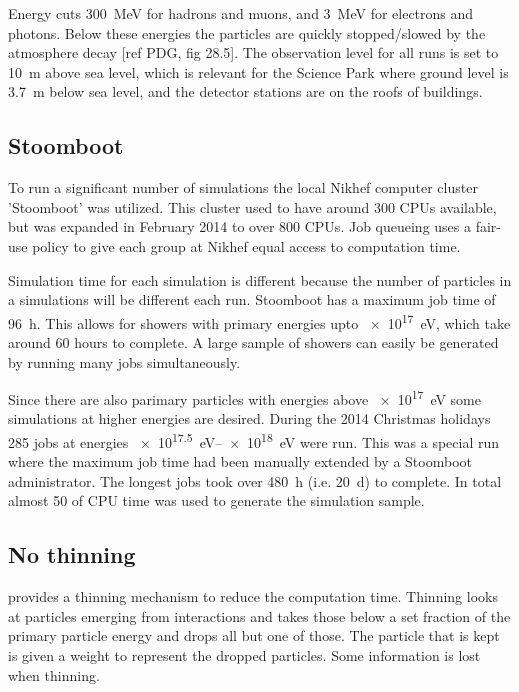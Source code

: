 Energy cuts \SI{300}{\mega\electronvolt} for hadrons and muons, and
\SI{3}{\mega\electronvolt} for electrons and photons. Below these
energies the particles are quickly stopped/slowed by the atmosphere
decay [ref PDG, fig 28.5]. The observation level for all runs is set to
\SI{10}{\meter} above sea level, which is relevant for the Science Park
where ground level is \SI{3.7}{\meter} below sea level, and the detector stations
are on the roofs of buildings.


\subsection{Stoomboot}

To run a significant number of simulations the local Nikhef
computer cluster 'Stoomboot' was utilized. This cluster used to have
around 300 CPUs available, but was expanded in February 2014 to over 800
CPUs. Job queueing uses a fair-use policy to give each group at Nikhef
equal access to computation time.

Simulation time for each simulation is different because the number of
particles in a simulations will be different each run. Stoomboot has a
maximum job time of \SI{96}{\hour}. This allows for showers with primary
energies upto \SI{e17}{\electronvolt}, which take around 60 hours to
complete. A large sample of showers can easily be generated by
running many jobs simultaneously.

Since there are also parimary particles with energies above \SI{e17}{\electronvolt} some simulations at higher energies are desired. During the 2014
Christmas holidays 285 jobs at energies \SIrange{e17.5}{e18}{\electronvolt} were run. This was a special run where the maximum job time had been manually extended by a Stoomboot administrator. The longest jobs took over \SI{480}{\hour} (i.e. \SI{20}{\day}) to complete. In total almost \SI{50}{\year} of CPU time was used to generate the simulation sample.

\begin{figure}
    \centering
    
    \caption{}
    \label{fig:simulations_shower_walltime}
\end{figure}


\subsection{No thinning}

\corsika provides a thinning mechanism to reduce the computation time.
Thinning looks at particles emerging from interactions and takes those
below a set fraction of the primary particle energy and drops all but
one of those. The particle that is kept is given a weight to represent
the dropped particles. Some information is lost when thinning. 

